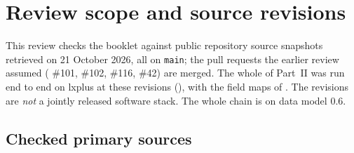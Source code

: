 \chapter{Review scope and source revisions}
\label{app:review}

This review checks the booklet against public repository source snapshots
retrieved on 21 October 2026, all on \texttt{main}; the pull requests the
earlier review assumed ( \#101, \#102, \#116,
 \#42) are merged. The whole of Part~II was run end to
end on lxplus at these revisions (), with the
field maps of . The revisions are \emph{not} a jointly
released software stack. The whole chain is on data
model 0.6.

\section{Checked primary sources}

